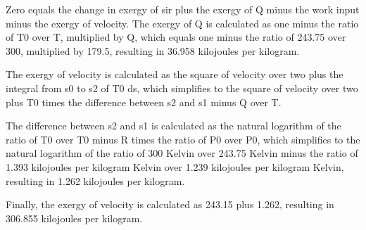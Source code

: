 Zero equals the change in exergy of sir plus the exergy of Q minus the work input minus the exergy of velocity. The exergy of Q is calculated as one minus the ratio of T0 over T, multiplied by Q, which equals one minus the ratio of 243.75 over 300, multiplied by 179.5, resulting in 36.958 kilojoules per kilogram.

The exergy of velocity is calculated as the square of velocity over two plus the integral from s0 to s2 of T0 ds, which simplifies to the square of velocity over two plus T0 times the difference between s2 and s1 minus Q over T.

The difference between s2 and s1 is calculated as the natural logarithm of the ratio of T0 over T0 minus R times the ratio of P0 over P0, which simplifies to the natural logarithm of the ratio of 300 Kelvin over 243.75 Kelvin minus the ratio of 1.393 kilojoules per kilogram Kelvin over 1.239 kilojoules per kilogram Kelvin, resulting in 1.262 kilojoules per kilogram.

Finally, the exergy of velocity is calculated as 243.15 plus 1.262, resulting in 306.855 kilojoules per kilogram.